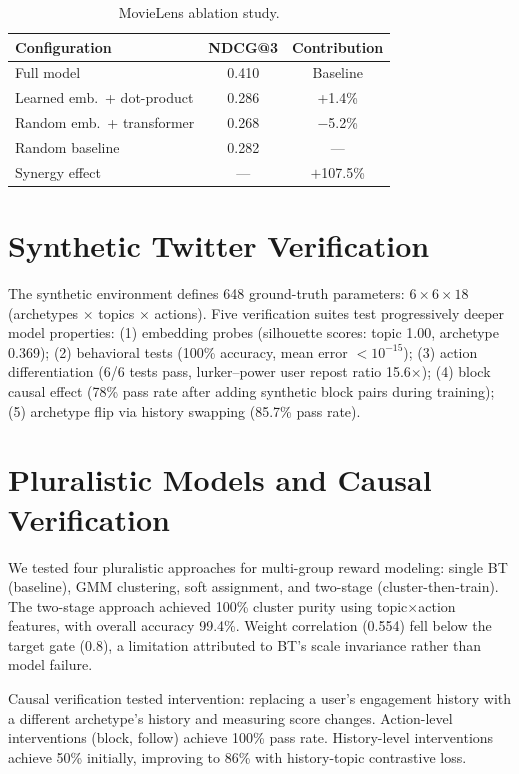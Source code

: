 \documentclass[11pt,letterpaper]{article}
\begin{document}
\begin{table}[H]
\caption{MovieLens ablation study.}
\label{tab:movielens-ablation}
\centering\small
\begin{tabular}{lcc}
\toprule
Configuration & NDCG@3 & Contribution \\
\midrule
Full model & 0.410 & Baseline \\
Learned emb.\ + dot-product & 0.286 & +1.4\% \\
Random emb.\ + transformer & 0.268 & $-$5.2\% \\
Random baseline & 0.282 & --- \\
\midrule
Synergy effect & --- & $+$107.5\% \\
\bottomrule
\end{tabular}
\end{table}

\section{Synthetic Twitter Verification}
\label{app:synthetic}

The synthetic environment defines 648 ground-truth parameters:
$6 \times 6 \times 18$ (archetypes $\times$ topics $\times$ actions).
Five verification suites test progressively deeper model properties:
(1) embedding probes (silhouette scores: topic 1.00, archetype 0.369);
(2) behavioral tests (100\% accuracy, mean error $< 10^{-15}$);
(3) action differentiation (6/6 tests pass, lurker--power user
repost ratio 15.6$\times$);
(4) block causal effect (78\% pass rate after adding synthetic block
pairs during training);
(5) archetype flip via history swapping (85.7\% pass rate).

\section{Pluralistic Models and Causal Verification}
\label{app:pluralistic}

We tested four pluralistic approaches for multi-group reward
modeling: single BT (baseline), GMM clustering, soft assignment, and
two-stage (cluster-then-train). The two-stage approach achieved 100\%
cluster purity using topic$\times$action features, with overall
accuracy 99.4\%. Weight correlation (0.554) fell below the target
gate (0.8), a limitation attributed to BT's scale invariance rather
than model failure.

Causal verification tested intervention: replacing a user's engagement
history with a different archetype's history and measuring score
changes. Action-level interventions (block, follow) achieve 100\%
pass rate. History-level interventions achieve 50\% initially,
improving to 86\% with history-topic contrastive loss.
\end{document}
